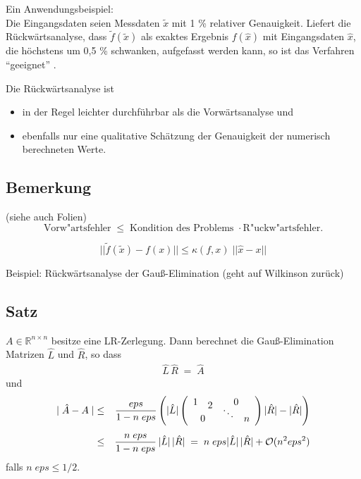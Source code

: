 \documentclass[ngerman,fontsize=11pt, paper=a4, parskip=half, titlepage=true, toc=bib]{scrbook}
\newcommand{\R}{\mathds{R}}
\begin{document}
  Ein Anwendungsbeispiel:\\
  Die Eingangsdaten seien Messdaten $\tilde{x}$  mit 1 \% relativer Genauigkeit. 
  Liefert die Rückwärtsanalyse, dass $\tilde{f} (\tilde{x})$ als exaktes Ergebnis 
  $f(\hat x)$ mit Eingangsdaten $\hat x$, 
  die höchstens um 0,5 \% schwanken, aufgefasst werden kann,
  so ist das Verfahren \enquote{geeignet} . 
  
  Die Rückwärtsanalyse ist
  \begin{itemize}
  \item in der Regel leichter durchführbar als die
    Vorwärtsanalyse  und 
  \item ebenfalls nur eine qualitative Schätzung der
    Genauigkeit der numerisch berechneten Werte.
  \end{itemize}
  
  \subsection{Bemerkung}
  (siehe auch Folien) \\
  $$ \mbox{Vorw"artsfehler} \; \leq \; \mbox{Kondition des
    Problems } \cdot \mbox{R"uckw"artsfehler} .$$
  
  $$ ||\tilde f (\tilde x)  - f(x)|| \leq \kappa (f,x) \; || \hat x -x|| $$
  
  Beispiel: Rückwärtsanalyse der Gauß-Elimination
  (geht auf Wilkinson zurück)
  
  
  \subsection{Satz}
  $A \in \R^{n\times n}$ besitze eine LR-Zerlegung. Dann berechnet die
  Gauß-Elimination Matrizen $\hat{L}$ und $\hat{R}$,
  so dass
  \begin{gather*}\hat{L}\,\hat{R}\; = \;\hat{A}\end{gather*}
  und
  \begin{align*}
    \mid \hat{ A} -  A \mid & \leq & \frac{eps}{1 -n \;eps}
                                     \left( | \hat{ L} | \left( \begin{array}{cccc}
                                                                  1 && \multicolumn{2}{c}{0}\\[-2ex] & 2
                                                                                                     &&\\[-2ex]
                                                                    &&\ddots & \\[-2ex]  \multicolumn{2}{c}{0} && n
                                                                \end{array} \right)
                                                                                                                  | \hat{ R} | - |\hat{ R}| \right)
    \\[1ex]
                            & \leq & \frac{n \; eps}{1- n \;eps}\, | \hat{ L} | \,
                                     |\hat{ R}| \; 
                                     = \; n \; eps  | \hat{ L} | \,  |\hat{ R}| +
                                     \mathcal{O}( n^2 eps^2)
  \end{align*}
  falls $n\;eps \leq 1/2$.
  
\end{document}
